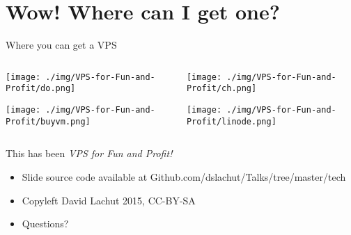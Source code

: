 \documentclass[presentation,aspectratio=169]{beamer}
\begin{document}
\section{Wow! Where can I get one?}
\label{sec-5}
\begin{frame}[label=sec-5-0-1]{Where you can get a VPS}
\begin{columns}
\begin{column}{0.48\textwidth}

\begin{center}
\texttt{[image: ./img/VPS-for-Fun-and-Profit/do.png]}
\end{center}

\begin{center}
\texttt{[image: ./img/VPS-for-Fun-and-Profit/buyvm.png]}
\end{center}
\end{column}

\begin{column}{0.48\textwidth}

\begin{center}
\texttt{[image: ./img/VPS-for-Fun-and-Profit/ch.png]}
\end{center}

\begin{center}
\texttt{[image: ./img/VPS-for-Fun-and-Profit/linode.png]}
\end{center}
\end{column}
\end{columns}
\end{frame}

\begin{frame}[label=sec-5-0-2]{This has been \emph{VPS for Fun and Profit!}}
\begin{itemize}
\item Slide source code available at \alert{Github.com/dslachut/Talks/tree/master/tech}
\item Copyleft David Lachut 2015, CC-BY-SA
\item Questions?
\end{itemize}
\end{frame}
\end{document}
